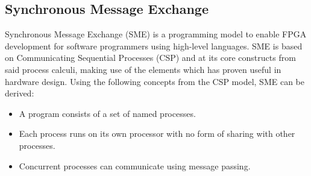 \documentclass[a4paper]{article}
\begin{document}
\subsection{Synchronous Message Exchange}
\label{SME}
Synchronous Message Exchange (SME) is a programming model to enable FPGA development for software programmers using high-level languages. SME is based on Communicating Sequential Processes (CSP) and at its core constructs from said process calculi, making use of the elements which has proven useful in hardware design\cite{sme}. Using the following concepts from the CSP model\cite{CSP}, SME can be derived:

\begin{itemize}
\item A program consists of a set of named processes.
\item Each process runs on its own processor with no form of sharing with other processes.
\item Concurrent processes can communicate using message passing.
\end{itemize}
\end{document}
